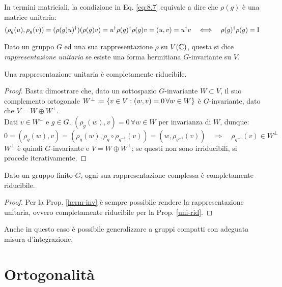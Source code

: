 In termini matriciali, la condizione in Eq. \ref{eq:8.7} equivale a dire che $ \rho(g) $ è una matrice unitaria:
\begin{equation*}
	(\rho_g(u),\rho_g(v)) = (\rho(g) u)^{\dagger}) (\rho(g) v) = u^{\dagger} \rho(g)^{\dagger} \rho(g) v = (u,v) = u^{\dagger} v \quad\Longleftrightarrow\quad \rho(g)^{\dagger} \rho(g) = \mathrm{I}
\end{equation*}

\begin{definition}
	Dato un gruppo $ G $ ed una sua rappresentazione $ \rho $ su $ V(\mathbb{C}) $, questa si dice \textit{rappresentazione unitaria} se esiste una forma hermitiana $ G $-invariante su $ V $.
\end{definition}

\begin{proposition}\label{uni-rid}
	Una rappresentazione unitaria è completamente riducibile.
\end{proposition}
\begin{proof}
	Basta dimostrare che, dato un sottospazio $ G $-invariante $ W \subset V $, il suo complemento ortogonale $ W^{\perp} \defeq \{v \in V : (w,v) = 0 \,\forall w \in W\} $ è $ G $-invariante, dato che $ V = W \oplus W^{\perp} $.\\
	Dati $ v \in W^{\perp} $ e $ g \in G $, $ (\rho_g(w),v) = 0 \,\forall w \in W $ per invarianza di $ W $, dunque:
	\begin{equation*}
		0 = (\rho_g(w),v) = (\rho_g(w),\rho_g \circ \rho_{g^{-1}}(v)) = (w,\rho_{g^{-1}}(v)) \quad\Rightarrow\quad \rho_{g^{-1}}(v) \in W^{\perp}
	\end{equation*}
	$ W^{\perp} $ è quindi $ G $-invariante e $ V = W \oplus W^{\perp} $; se questi non sono irriducibili, si procede iterativamente.
\end{proof}

\begin{theorem}[Maschke]
	Dato un gruppo finito $ G $, ogni sua rappresentazione complessa è completamente riducibile.
\end{theorem}
\begin{proof}
	Per la Prop. \ref{herm-inv} è sempre possibile rendere la rappresentazione unitaria, ovvero completamente riducibile per la Prop. \ref{uni-rid}.
\end{proof}

Anche in questo caso è possibile generalizzare a gruppi compatti con adeguata misura d'integrazione.

\section{Ortogonalità}

